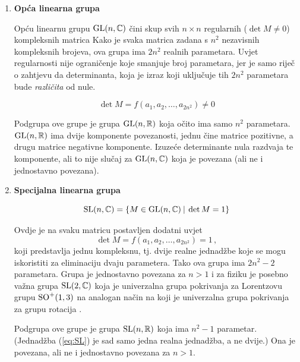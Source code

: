\begin{enumerate}[leftmargin=0pt, itemindent=0pt]

\item \textbf{Opća linearna grupa}

Opću linearnu grupu $\mathrm{GL}(n, \mathbb{C})$ čini
skup svih $n\times n$ regularnih ($\det M \neq 0$)
kompleksnih matrica
Kako je svaka matrica zadana s $n^2$ nezavisnih kompleksnih brojeva, ova
grupa ima $2 n^2$ realnih parametara. Uvjet regularnosti nije ograničenje
koje smanjuje broj parametara, jer je samo riječ o zahtjevu da determinanta,
koja je izraz koji uključuje tih $2 n^2$ parametara bude \emph{različita} od nule.

\begin{equation}
\det M = f(a_1, a_2 , \dots, a_{2n^2}) \neq 0
\end{equation}

Podgrupa ove grupe je grupa $\mathrm{GL}(n, \mathbb{R})$ koja očito ima samo
$n^2$ parametara. $\mathrm{GL}(n, \mathbb{R})$ ima dvije komponente povezanosti,
jednu čine matrice pozitivne, a drugu matrice negativne komponente.
Izuzeće determinante nula razdvaja te komponente, ali to nije slučaj
za $\mathrm{GL}(n, \mathbb{C})$ koja je povezana (ali ne i jednostavno povezana).

\item \textbf{Specijalna linearna grupa}

\begin{equation}
\mathrm{SL}(n, \mathbb{C}) = \{ M\in \mathrm{GL}(n,\mathbb{C}) \: | \: \det M = 1\}
\end{equation}

Ovdje je na svaku matricu postavljen dodatni uvjet
\begin{equation}
\det M = f(a_1, a_2 , \dots, a_{2n^2}) = 1 \,,
\label{eq:SL}
\end{equation}
koji predstavlja jednu kompleksnu, tj. dvije realne jednadžbe koje
se mogu iskoristiti za eliminaciju dvaju parametera. Tako ova grupa
ima $2 n^2 - 2$ parametara. Grupa je jednostavno povezana za $n>1$ i za fiziku
je posebno važna grupa $\mathrm{SL}(2, \mathbb{C})$ koja je univerzalna grupa
pokrivanja za Lorentzovu grupu $\mathrm{SO}^{+}(1,3)$ na analogan način na koji je 
univerzalna grupa pokrivanja za grupu rotacija .

Podgrupa ove grupe je grupa $\mathrm{SL}(n, \mathbb{R})$ koja ima 
$n^2 - 1$ parametar. (Jednadžba (\ref{eq:SL}) je sad samo jedna
realna jednadžba, a ne dvije.) Ona je povezana, ali ne i jednostavno
povezana za $n>1$.


\end{enumerate}
